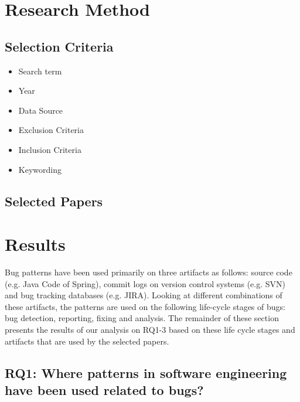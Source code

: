 \documentclass[conference]{IEEEtran}
\begin{document}
\section{Research Method}

\subsection{Selection Criteria}

\begin{itemize}
  \item Search term
  \item Year
  \item Data Source
  \item Exclusion Criteria
  \item Inclusion Criteria
  \item Keywording
\end{itemize}

\subsection{Selected Papers}




\section{Results} %
\label{sec:results}
Bug patterns have been used primarily on three artifacts as follows: source code (e.g. Java Code of Spring), commit logs on version control systems (e.g. SVN) and bug tracking databases (e.g. JIRA). Looking at different combinations of these artifacts, the patterns are used on the following life-cycle stages of bugs: bug detection, reporting, fixing and analysis. The remainder of these section presents the results of our analysis on RQ1-3 based on these life cycle stages and artifacts that are used by the selected papers.


\subsection{RQ1: Where patterns in software engineering have been used related to bugs?} %
\label{sub:rq1_}
\end{document}
